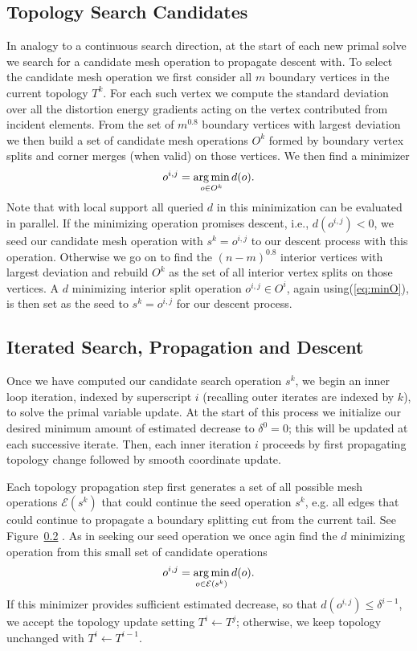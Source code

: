 \subsection{Topology Search Candidates}
In analogy to a continuous search direction, at the start of each new primal solve we search for a candidate mesh operation to propagate descent with. 
%
To select the candidate mesh operation we first consider all $m$ boundary vertices in the current topology $T^k$.  For each such vertex we compute the standard deviation over all the distortion energy gradients acting on the vertex contributed from incident elements. From the set of $m^{0.8}$ boundary vertices with largest deviation we then build a set of candidate mesh operations $O^k$ formed by boundary vertex splits and corner merges (when valid) on those vertices. We then find a minimizer
\begin{align}
\label{eq:minO}
o^{i,j} = \operatorname*{arg\,min}_{o \in O^k} d(o).
\end{align}
Note that with local support all queried $d$ in this minimization can be evaluated in parallel. If the minimizing operation promises descent, i.e., $d(o^{i,j}) < 0$, we seed our candidate mesh operation with $s^k = o^{i,j}$ to our descent process with this operation. Otherwise we go on to find the $(n-m)^{0.8}$ interior vertices with largest deviation and rebuild $O^k$ as the set of all interior vertex splits on those vertices. A $d$ minimizing interior split operation $o^{i,j} \in O^i$, again using(\ref{eq:minO}), is then set as the seed to $s^k = o^{i,j}$ for our descent process.

\subsection{Iterated Search, Propagation and Descent}

Once we have computed our candidate search operation $s^k$, we begin an inner loop iteration, indexed by superscript $i$ (recalling outer iterates are indexed by $k$), to solve the primal variable update. At the start of this process we initialize our desired minimum amount of estimated decrease to $\delta^0 = 0$; this will be updated at each successive iterate. Then, each inner iteration $i$ proceeds by first propagating topology change followed by smooth coordinate update. 

Each topology propagation step first generates a set of all possible mesh operations $\mathcal{E}(s^k)$ that could continue the seed operation $s^k$, e.g. all edges that could continue to propagate a boundary splitting cut from the current tail. See Figure\ \ref{}  .
As in seeking our seed operation we once agin find the $d$ minimizing operation from this small set of candidate operations
\begin{align}
\label{eq:minE}
o^{i,j} = \operatorname*{arg\,min}_{o \in \mathcal{E}(s^k)} d(o).
\end{align}
If this minimizer provides sufficient estimated decrease, so that $d(o^{i,j}) \leq \delta^{i-1}$, we accept the topology update setting $T^i \leftarrow T^j$; otherwise, we keep topology unchanged with $T^i \leftarrow T^{i-1}.$ 

